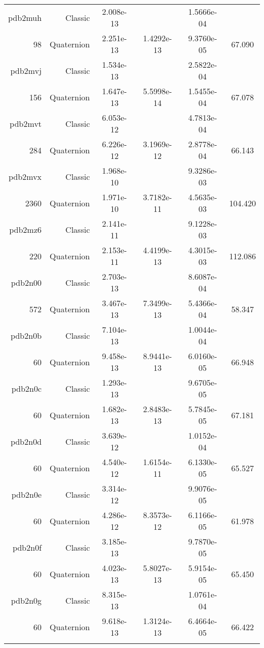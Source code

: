 \begin{xltabular}{\textwidth}{r|rS[table-format=1.3e+2]S[table-format=1.4e+2]S[table-format=1.4e+2]S[table-format=-1.3]}
pdb2muh & Classic & 2.008e-13 &  & 1.5666e-04 & \\
98 & Quaternion & 2.251e-13 & 1.4292e-13 & 9.3760e-05 & 67.090\\  \addlinespace
pdb2mvj & Classic & 1.534e-13 &  & 2.5822e-04 & \\
156 & Quaternion & 1.647e-13 & 5.5998e-14 & 1.5455e-04 & 67.078\\  \addlinespace
pdb2mvt & Classic & 6.053e-12 &  & 4.7813e-04 & \\
284 & Quaternion & 6.226e-12 & 3.1969e-12 & 2.8778e-04 & 66.143\\  \addlinespace
pdb2mvx & Classic & 1.968e-10 &  & 9.3286e-03 & \\
2360 & Quaternion & 1.971e-10 & 3.7182e-11 & 4.5635e-03 & 104.420\\  \addlinespace
pdb2mz6 & Classic & 2.141e-11 &  & 9.1228e-03 & \\
220 & Quaternion & 2.153e-11 & 4.4199e-13 & 4.3015e-03 & 112.086\\  \addlinespace
pdb2n00 & Classic & 2.703e-13 &  & 8.6087e-04 & \\
572 & Quaternion & 3.467e-13 & 7.3499e-13 & 5.4366e-04 & 58.347\\  \addlinespace
pdb2n0b & Classic & 7.104e-13 &  & 1.0044e-04 & \\
60 & Quaternion & 9.458e-13 & 8.9441e-13 & 6.0160e-05 & 66.948\\  \addlinespace
pdb2n0c & Classic & 1.293e-13 &  & 9.6705e-05 & \\
60 & Quaternion & 1.682e-13 & 2.8483e-13 & 5.7845e-05 & 67.181\\  \addlinespace
pdb2n0d & Classic & 3.639e-12 &  & 1.0152e-04 & \\
60 & Quaternion & 4.540e-12 & 1.6154e-11 & 6.1330e-05 & 65.527\\  \addlinespace
pdb2n0e & Classic & 3.314e-12 &  & 9.9076e-05 & \\
60 & Quaternion & 4.286e-12 & 8.3573e-12 & 6.1166e-05 & 61.978\\  \addlinespace
pdb2n0f & Classic & 3.185e-13 &  & 9.7870e-05 & \\
60 & Quaternion & 4.023e-13 & 5.8027e-13 & 5.9154e-05 & 65.450\\  \addlinespace
pdb2n0g & Classic & 8.315e-13 &  & 1.0761e-04 & \\
60 & Quaternion & 9.618e-13 & 1.3124e-13 & 6.4664e-05 & 66.422\\  \addlinespace

\end{xltabular}
